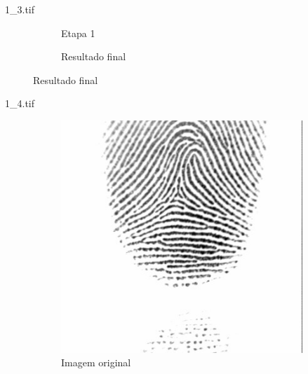 \documentclass{beamer}
\begin{document}
\begin{frame}{1\_3.tif}
\begin{figure}
\begin{subfigure}[!ht]{0.32\textwidth}
                \caption{Etapa 1}
            \end{subfigure}
            \begin{subfigure}[!ht]{0.32\textwidth}
                \caption{Resultado final}
            \end{subfigure}
        \end{figure}
    \end{frame}

    \begin{frame}{1\_4.tif}
        \begin{figure}
            \centering
            \begin{subfigure}[!ht]{0.32\textwidth}
                \includegraphics[width=\columnwidth]{Fingerprints/1_4.jpg}
                \caption{Imagem original}
            \end{subfigure}
            \begin{subfigure}[!ht]{0.32\textwidth}

\end{subfigure}
\end{figure}
\end{frame}
\end{document}

